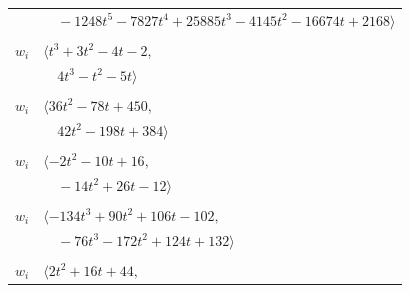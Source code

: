 \documentclass[11pt]{article}
\begin{document}
\begin{longtable}{@{}ll@{}}
 & $\quad -1248t^{5}-7827t^{4}+25885t^{3}-4145t^{2}-16674t+2168\rangle$\\
\addlinespace[2pt]
\multicolumn{2}{@{}p{0.97\textwidth}@{}}{$i=36$, $D_i=1$, $\varphi_i=1$, $\rho_{ij}$: $2{:}1, \allowbreak 4{:}3, \allowbreak 6{:}3, \allowbreak 14{:}1, \allowbreak 23{:}1, \allowbreak 33{:}2, \allowbreak 34{:}1, \allowbreak 37{:}2, \allowbreak 46{:}2$}\\
$w_i$ & $\langle t^{3}+3t^{2}-4t-2,$\\
 & $\quad 4t^{3}-t^{2}-5t\rangle$\\
\addlinespace[2pt]
\multicolumn{2}{@{}p{0.97\textwidth}@{}}{$i=37$, $D_i=1$, $\varphi_i=1$, $\rho_{ij}$: $0{:}1, \allowbreak 3{:}2, \allowbreak 4{:}3, \allowbreak 7{:}1, \allowbreak 8{:}2, \allowbreak 10{:}3, \allowbreak 15{:}2, \allowbreak 25{:}1, \allowbreak 26{:}3, \allowbreak 31{:}1, \allowbreak 34{:}1, \allowbreak 36{:}2, \allowbreak 40{:}2, \allowbreak 44{:}2$}\\
$w_i$ & $\langle 36t^{2}-78t+450,$\\
 & $\quad 42t^{2}-198t+384\rangle$\\
\addlinespace[2pt]
\multicolumn{2}{@{}p{0.97\textwidth}@{}}{$i=39$, $D_i=1$, $\varphi_i=1$, $\rho_{ij}$: $0{:}2, \allowbreak 3{:}2, \allowbreak 9{:}2, \allowbreak 10{:}3, \allowbreak 12{:}3, \allowbreak 19{:}2, \allowbreak 21{:}3, \allowbreak 22{:}1, \allowbreak 24{:}2, \allowbreak 29{:}1, \allowbreak 40{:}1, \allowbreak 41{:}1$}\\
$w_i$ & $\langle -2t^{2}-10t+16,$\\
 & $\quad -14t^{2}+26t-12\rangle$\\
\addlinespace[2pt]
\multicolumn{2}{@{}p{0.97\textwidth}@{}}{$i=40$, $D_i=1$, $\varphi_i=1$, $\rho_{ij}$: $2{:}1, \allowbreak 4{:}3, \allowbreak 6{:}3, \allowbreak 9{:}2, \allowbreak 12{:}1, \allowbreak 13{:}1, \allowbreak 17{:}2, \allowbreak 18{:}3, \allowbreak 25{:}3, \allowbreak 26{:}2, \allowbreak 27{:}1, \allowbreak 37{:}2, \allowbreak 38{:}1, \allowbreak 39{:}3$}\\
$w_i$ & $\langle -134t^{3}+90t^{2}+106t-102,$\\
 & $\quad -76t^{3}-172t^{2}+124t+132\rangle$\\
\addlinespace[2pt]
\multicolumn{2}{@{}p{0.97\textwidth}@{}}{$i=43$, $D_i=1$, $\varphi_i=1$, $\rho_{ij}$: $5{:}3, \allowbreak 12{:}1, \allowbreak 15{:}1, \allowbreak 16{:}1, \allowbreak 17{:}1, \allowbreak 21{:}3, \allowbreak 41{:}3$}\\
$w_i$ & $\langle 2t^{2}+16t+44,$\\

\end{longtable}
\end{document}
